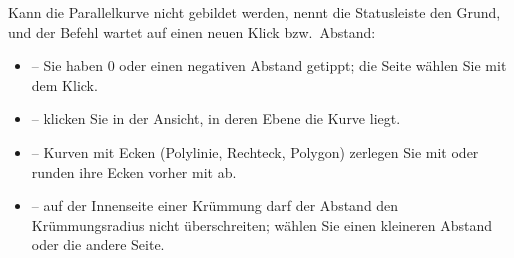Kann die Parallelkurve nicht gebildet werden, nennt die Statusleiste den Grund, und der Befehl
wartet auf einen neuen Klick bzw.\ Abstand:
\begin{itemize}
\item {} -- Sie haben 0 oder
  einen negativen Abstand getippt; die Seite wählen Sie mit dem Klick.
\item {} -- klicken Sie in der Ansicht, in deren
  Ebene die Kurve liegt.
\item {} -- Kurven mit Ecken (Polylinie, Rechteck, Polygon) zerlegen Sie mit
   oder runden ihre Ecken vorher mit  ab.
\item {} --
  auf der Innenseite einer Krümmung darf der Abstand den Krümmungsradius nicht überschreiten;
  wählen Sie einen kleineren Abstand oder die andere Seite.
\end{itemize}

